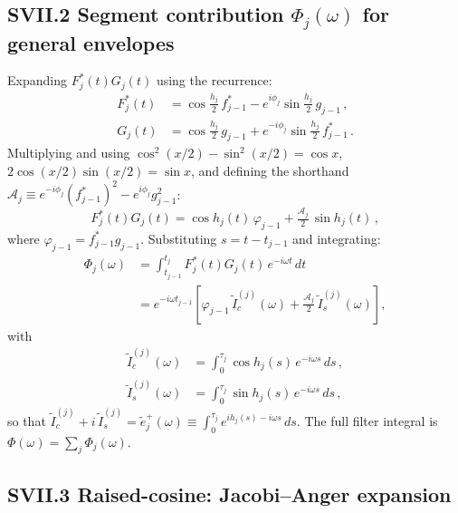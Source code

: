 \documentclass[aps,pra,twocolumn,superscriptaddress,longbibliography]{revtex4-2}
\newcommand{\be}{\begin{equation}}
\newcommand{\ee}{\end{equation}}
\begin{document}
       \subsection*{SVII.2 Segment contribution $\Phi_j(\omega)$ for general envelopes}

       Expanding $F_j^*(t)G_j(t)$ using the recurrence:
       \begin{align}
         F_j^*(t) &= \cos\tfrac{h_j}{2}\,f_{j-1}^* - e^{i\phi_j}\sin\tfrac{h_j}{2}\,g_{j-1}\,,     
        \\
         G_j(t)   &= \cos\tfrac{h_j}{2}\,g_{j-1}   +
       e^{-i\phi_j}\sin\tfrac{h_j}{2}\,f_{j-1}^*\,.
       \end{align}
       Multiplying and using $\cos^2(x/2)-\sin^2(x/2)=\cos x$, $2\cos(x/2)\sin(x/2)=\sin x$,
       and defining the shorthand
       $\mathcal{A}_j \equiv e^{-i\phi_j}(f_{j-1}^*)^2 - e^{i\phi_j}g_{j-1}^2$:
       \be
         F_j^*(t)G_j(t) = \cos h_j(t)\,\varphi_{j-1}
           + \tfrac{\mathcal{A}_j}{2}\,\sin h_j(t)\,,
       \ee
       where $\varphi_{j-1}=f_{j-1}^*g_{j-1}$.  Substituting $s=t-t_{j-1}$ and integrating:
       \begin{align}
         \Phi_j(\omega) &= \int_{t_{j-1}}^{t_j}F_j^*(t)G_j(t)\,e^{-i\omega t}\,dt \\
         &= e^{-i\omega t_{j-1}}\!\left[
           \varphi_{j-1}\,\tilde{I}_c^{(j)}(\omega)
           + \tfrac{\mathcal{A}_j}{2}\,\tilde{I}_s^{(j)}(\omega)
         \right]\!,
       \end{align}
       with
       \begin{align}
         \tilde{I}_c^{(j)}(\omega) &= \int_0^{\tau_j}\cos h_j(s)\,e^{-i\omega s}\,ds\,, \\
         \tilde{I}_s^{(j)}(\omega) &= \int_0^{\tau_j}\sin h_j(s)\,e^{-i\omega s}\,ds\,,
       \end{align}
       so that $\tilde{I}_c^{(j)}+i\,\tilde{I}_s^{(j)} = \tilde{e}_j^+(\omega) \equiv
       \int_0^{\tau_j}e^{ih_j(s)-i\omega s}\,ds$.
       The full filter integral is $\Phi(\omega)=\sum_j\Phi_j(\omega)$.

       \subsection*{SVII.3 Raised-cosine: Jacobi--Anger expansion}
\end{document}
